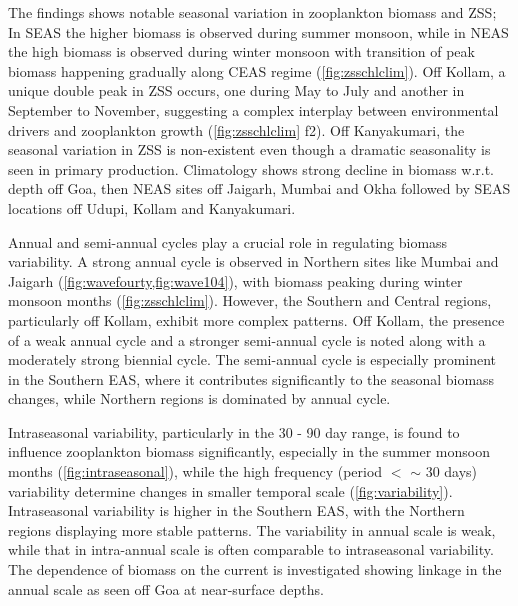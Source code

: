 \documentclass{article}
\begin{document}
	The findings shows notable seasonal variation in zooplankton biomass and ZSS; In SEAS the higher biomass is observed during summer monsoon, while in NEAS the high biomass is observed during winter monsoon with transition of peak biomass happening gradually along CEAS regime (\cref{fig:zsschlclim}). Off Kollam, a unique double peak in ZSS occurs, one during May to July and another in September to November, suggesting a complex interplay between environmental drivers and zooplankton growth (\cref{fig:zsschlclim} f2). Off Kanyakumari, the seasonal variation in ZSS is non-existent even though a dramatic seasonality is seen in primary production. Climatology shows strong decline in biomass w.r.t. depth off Goa, then NEAS sites off Jaigarh, Mumbai and Okha followed by SEAS locations off Udupi, Kollam and Kanyakumari.

	Annual and semi-annual cycles play a crucial role in regulating biomass variability. A strong annual cycle is observed in Northern sites like Mumbai and Jaigarh (\cref{fig:wavefourty,fig:wave104}), with biomass peaking during winter monsoon months (\cref{fig:zsschlclim}). However, the Southern and Central regions, particularly off Kollam, exhibit more complex patterns. Off Kollam, the presence of a weak annual cycle and a stronger semi-annual cycle is noted along with a moderately strong biennial cycle. The semi-annual cycle is especially prominent in the Southern EAS, where it contributes significantly to the seasonal biomass changes, while Northern regions is dominated by annual cycle. 
	
	Intraseasonal variability, particularly in the 30 - 90 day range, is found to influence zooplankton biomass significantly, especially in the summer monsoon months (\cref{fig:intraseasonal}), while the high frequency (period $<$ $\sim$ 30 days) variability determine changes in smaller temporal scale (\cref{fig:variability}). Intraseasonal variability is higher in the Southern EAS, with the Northern regions displaying more stable patterns. The variability in annual scale is weak, while that in intra-annual scale is often comparable to intraseasonal variability. The dependence of biomass on the current is investigated showing linkage in the annual scale as seen off Goa at near-surface depths. 
	
		
\end{document}
